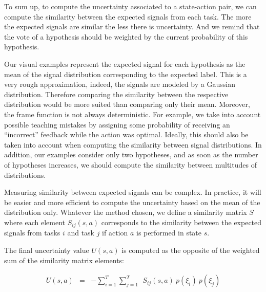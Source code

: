 To sum up, to compute the uncertainty associated to a state-action pair, we can compute the similarity between the expected signals from each task. The more the expected signals are similar the less there is uncertainty. And we remind that the vote of a hypothesis should be weighted by the current probability of this hypothesis.


Our visual examples represent the expected signal for each hypothesis as the mean of the signal distribution corresponding to the expected label. This is a very rough approximation, indeed, the signals are modeled by a Gaussian distribution. Therefore comparing the similarity between the respective distribution would be more suited than comparing only their mean. Moreover, the frame function is not always deterministic. For example, we take into account possible teaching mistakes by assigning some probability of receiving an ``incorrect'' feedback while the action was optimal. Ideally, this should also be taken into account when computing the similarity between signal distributions. In addition, our examples consider only two hypotheses, and as soon as the number of hypotheses increases, we should compute the similarity between multitudes of distributions. 

Measuring similarity between expected signals can be complex. In practice, it will be easier and more efficient to compute the uncertainty based on the mean of the distribution only. Whatever the method chosen, we define a similarity matrix $S$ where each element $S_{ij}(s,a)$ corresponds to the similarity between the expected signals from tasks $i$ and task $j$ if action $a$ is performed in state $s$.


The final uncertainty value $U(s,a)$ is computed as the opposite of the weighted sum of the similarity matrix elements:

\begin{eqnarray}
U(s,a) &=& - \sum_{i = 1}^{T} \sum_{j = 1}^{T} ~~ S_{ij}(s,a) ~ p(\xi_i) ~ p(\xi_j)
\end{eqnarray}

